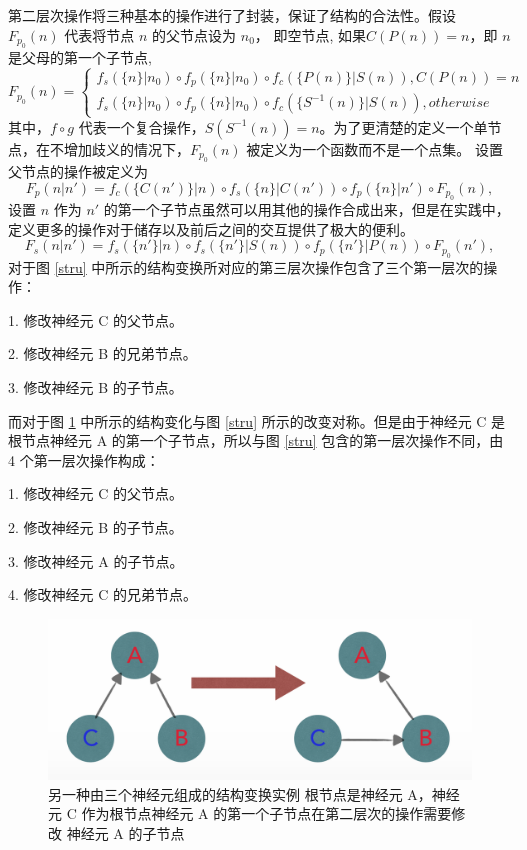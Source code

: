 第二层次操作将三种基本的操作进行了封装，保证了结构的合法性。假设 $F_{p_0}(n)$ 代表将节点 $n$ 的父节点设为 $n_0$， 即空节点, 如果$C(P(n)) = n$，即 $n$ 是父母的第一个子节点,
$$
F_{p_0}(n) =
\left\{
\begin{aligned}
f_s(\{n\} | n_0) \circ f_p(\{n\} | n_0) \circ f_c(\{P(n)\} | S(n)), C(P(n)) = n\\
f_s(\{n\} | n_0) \circ f_p(\{n\} | n_0) \circ f_c(\{S^{-1}(n)\} | S(n)), otherwise
\end{aligned}
\right.
$$
其中，$f \circ g$ 代表一个复合操作，$S(S^{-1}(n)) = n$。为了更清楚的定义一个单节点，在不增加歧义的情况下，$F_{p_0}(n)$ 被定义为一个函数而不是一个点集。
设置父节点的操作被定义为
$$F_p(n|n') = f_c(\{C(n')\}|n) \circ f_s(\{n\}|C(n'))  \circ f_p(\{n\}|n') \circ F_{p_0}(n),$$
设置 $n$ 作为 $n{}'$ 的第一个子节点虽然可以用其他的操作合成出来，但是在实践中，定义更多的操作对于储存以及前后之间的交互提供了极大的便利。
$$F_s(n|n') = f_s(\{n'\}|n) \circ f_s(\{n'\}|S(n))  \circ f_p(\{n'\}|P(n)) \circ F_{p_0}(n'),$$
对于图 \ref{stru} 中所示的结构变换所对应的第三层次操作包含了三个第一层次的操作：

1. 修改神经元 C 的父节点。

2. 修改神经元 B 的兄弟节点。

3. 修改神经元 B 的子节点。

而对于图 \ref{stru2} 中所示的结构变化与图 \ref{stru} 所示的改变对称。但是由于神经元 C 是根节点神经元 A 的第一个子节点，所以与图 \ref{stru} 包含的第一层次操作不同，由 4 个第一层次操作构成：

1. 修改神经元 C 的父节点。

2. 修改神经元 B 的子节点。

3. 修改神经元 A 的子节点。

4. 修改神经元 C 的兄弟节点。

\begin{figure}[!ht]
\centering
\includegraphics[width=148mm]{images/stru2}
\caption{另一种由三个神经元组成的结构变换实例 根节点是神经元 A，神经元 C 作为根节点神经元 A 的第一个子节点在第二层次的操作需要修改 神经元 A 的子节点}
\label{stru2}
\end{figure}

